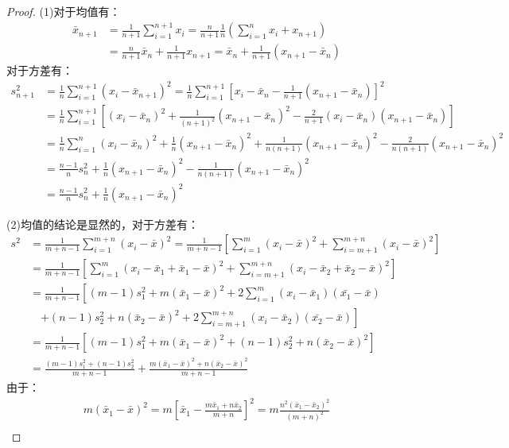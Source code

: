 \begin{proof}
	(1)对于均值有：
	\begin{align*}
		\bar{x}_{n+1}&=\frac{1}{n+1}\sum_{i=1}^{n+1}x_i=\frac{n}{n+1}\frac{1}{n}\left(\sum_{i=1}^{n}x_i+x_{n+1}\right) \\
		&=\frac{n}{n+1}\bar{x}_n+\frac{1}{n+1}x_{n+1}=\bar{x}_n+\frac{1}{n+1}(x_{n+1}-\bar{x}_n)
	\end{align*}
	对于方差有：
	\begin{align*}
		s_{n+1}^2&=\frac{1}{n}\sum_{i=1}^{n+1}(x_i-\bar{x}_{n+1})^2=\frac{1}{n}\sum_{i=1}^{n+1}\left[x_i-\bar{x}_n-\frac{1}{n+1}(x_{n+1}-\bar{x}_n)\right]^2 \\
		&=\frac{1}{n}\sum_{i=1}^{n+1}\left[(x_i-\bar{x}_n)^2+\frac{1}{(n+1)^2}(x_{n+1}-\bar{x}_n)^2-\frac{2}{n+1}(x_i-\bar{x}_n)(x_{n+1}-\bar{x}_n)\right] \\
		&=\frac{1}{n}\sum_{i=1}^{n}(x_i-\bar{x}_n)^2+\frac{1}{n}(x_{n+1}-\bar{x}_n)^2+\frac{1}{n(n+1)}(x_{n+1}-\bar{x}_n)^2-\frac{2}{n(n+1)}(x_{n+1}-\bar{x}_n)^2 \\
		&=\frac{n-1}{n}s_n^2+\frac{1}{n}(x_{n+1}-\bar{x}_n)^2-\frac{1}{n(n+1)}(x_{n+1}-\bar{x}_n)^2 \\
		&=\frac{n-1}{n}s_n^2+\frac{1}{n}(x_{n+1}-\bar{x}_n)^2
	\end{align*}\par
	(2)均值的结论是显然的，对于方差有：
	\begin{align*}
		s^2&=\frac{1}{m+n-1}\sum_{i=1}^{m+n}(x_i-\bar{x})^2=\frac{1}{m+n-1}\left[\sum_{i=1}^{m}(x_i-\bar{x})^2+\sum_{i=m+1}^{m+n}(x_i-\bar{x})^2\right] \\
		&=\frac{1}{m+n-1}\left[\sum_{i=1}^{m}(x_i-\bar{x}_1+\bar{x}_1-\bar{x})^2+\sum_{i=m+1}^{m+n}(x_i-\bar{x}_2+\bar{x}_2-\bar{x})^2\right] \\
		&=\frac{1}{m+n-1}\left[(m-1)s_1^2+m(\bar{x}_1-\bar{x})^2+2\sum_{i=1}^{m}(x_i-\bar{x}_1)(\bar{x_1}-\bar{x})\right. \\
		&\quad\left.+(n-1)s_2^2+n(\bar{x}_2-\bar{x})^2+2\sum_{i=m+1}^{m+n}(x_i-\bar{x}_2)(\bar{x_2}-\bar{x})\right] \\
		&=\frac{1}{m+n-1}\left[(m-1)s_1^2+m(\bar{x}_1-\bar{x})^2+(n-1)s_2^2+n(\bar{x}_2-\bar{x})^2\right] \\
		&=\frac{(m-1)s_1^2+(n-1)s_2^2}{m+n-1}+\frac{m(\bar{x}_1-\bar{x})^2+n(\bar{x}_2-\bar{x})^2}{m+n-1}
	\end{align*}
	由于：
	\begin{gather*}
		m(\bar{x}_1-\bar{x})^2=m\left[\bar{x}_1-\frac{m\bar{x}_1+n\bar{x}_2}{m+n}\right]^2=m\frac{n^2(\bar{x}_1-\bar{x}_2)^2}{(m+n)^2} \\

\end{gather*}
\end{proof}
